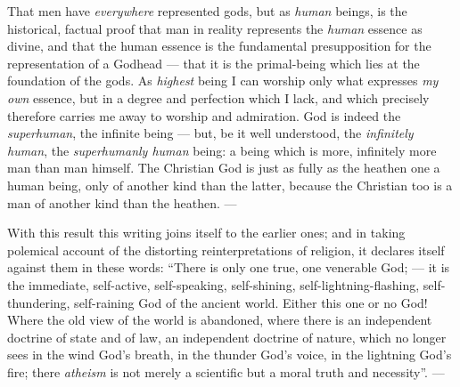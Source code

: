 \documentclass[12pt,a4paper]{book}
\begin{document}
That men have \emph{everywhere} represented gods, but as \emph{human} beings,
is the historical, factual proof that man in reality represents the
\emph{human} essence as divine, and that the human essence is the fundamental
presupposition for the representation of a Godhead --- that it is the
primal-being which lies at the foundation of
\setcounter{footnote}{0}%
the gods. As \emph{highest} being I can worship only what expresses \emph{my
own} essence, but in a degree and perfection which I lack, and which precisely
therefore carries me away to worship and admiration. God is indeed the
\emph{superhuman}, the infinite being --- but, be it well understood, the
\emph{infinitely human}, the \emph{superhumanly human} being: a being which is
more, infinitely more man than man himself. The Christian God is just as fully
as the heathen one a human being, only of another kind than the latter,
because the Christian too is a man of another kind than the heathen. ---

With this result this writing joins itself to the earlier ones; and in taking
polemical account of the distorting reinterpretations of religion, it declares
itself against them in these words: ``There is only one true, one venerable
God; --- it is the immediate, self-active, self-speaking, self-shining,
self-lightning-flashing, self-thundering, self-raining God of the ancient
world. Either this one or no God! Where the old view of the world is
abandoned, where there is an independent doctrine of state and of law, an
independent doctrine of nature, which no longer sees in the wind God's breath,
in the thunder God's voice, in the lightning God's fire; there
\emph{atheism} is not merely a scientific but a moral truth and
necessity''. ---
\end{document}
